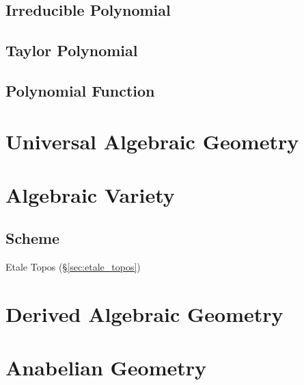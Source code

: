 \subsection{Irreducible Polynomial}\label{sec:irreducible_polynomial}

\subsection{Taylor Polynomial}\label{sec:taylor_polynomial}

\subsection{Polynomial Function}\label{sec:polynomial_function}



\section{Universal Algebraic Geometry}\label{sec:universal_geometry}



\section{Algebraic Variety}\label{sec:algebraic_variety}

\subsection{Scheme}\label{sec:scheme}

Etale Topos (\S\ref{sec:etale_topos})



\section{Derived Algebraic Geometry}
\label{sec:derived_algebraic_geometry}

\section{Anabelian Geometry}\label{sec:anabelian_geometry}
